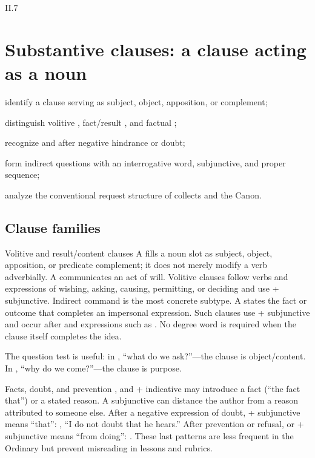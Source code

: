 \begin{courseunit}{II.7}
\chapter{Substantive clauses: a clause acting as a noun}

\begin{learningobjectives}
  \item identify a clause serving as subject, object, apposition, or complement;
  \item distinguish volitive , fact/result , and factual
        ;
  \item recognize  and  after negative hindrance or doubt;
  \item form indirect questions with an interrogative word, subjunctive, and proper sequence;
  \item analyze the conventional request structure of collects and the Canon.
\end{learningobjectives}

\section{Clause families}

\begin{grammarbox}{Volitive and result/content clauses}
A  fills a noun slot as subject, object, apposition, or
predicate complement; it does not merely modify a verb adverbially. A
 communicates an act of will. Volitive clauses follow
verbs and expressions of wishing, asking, causing, permitting, or
deciding and use  + subjunctive.  Indirect command is the most concrete subtype.
A  states the fact or outcome that completes an
impersonal expression. Such clauses use  + subjunctive and
occur after  and expressions such as
. No degree word is required
when the clause itself completes the idea.

The question test is useful: in , ``what do we ask?''---the clause is
object/content.  In , ``why do we come?''---the clause is purpose.
\end{grammarbox}

\begin{grammarbox}{Facts, doubt, and prevention}
, and  + indicative may introduce a fact (``the fact that'')
or a stated reason.  A subjunctive can distance the author from a reason attributed to someone
else.  After a negative expression of doubt,  + subjunctive means ``that'':
, ``I do not doubt that he hears.''  After prevention or refusal,
 or  + subjunctive means ``from doing'':
.  These last patterns are less frequent in the Ordinary
but prevent misreading in lessons and rubrics.
\end{grammarbox}


\end{courseunit}

